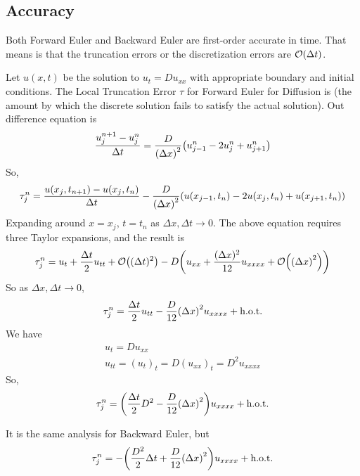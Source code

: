 \documentclass{article}
\newcommand{\Dx}{\Delta x}
\newcommand{\Dt}{\Delta t}
\newcommand{\hot}{\text{h.o.t.}}
\begin{document}
        \subsection{Accuracy}

            Both Forward Euler and Backward Euler are first-order accurate in time.  That means is that the truncation errors or the discretization errors are $\order{\Dt}$.

            Let $u(x,t)$ be the solution to $u_t = Du_{xx}$ with appropriate boundary and initial conditions.  The Local Truncation Error $\tau$ for Forward Euler for Diffusion is (the amount by which the discrete solution fails to satisfy the actual solution).  Out difference equation is
            \begin{align}
                \frac{u_j^{n+1} - u_j^n}{\Dt} = \frac{D}{\qty(\Dx)^2}\qty(u_{j-1}^n - 2u_j^n + u_{j+1}^n)
            \end{align}
            So,
            \begin{align}
                \tau_j^n = \frac{u(x_j,t_{n+1}) - u(x_j,t_n)}{\Dt} - \frac{D}{\qty(\Dx)^2}\qty(u(x_{j-1},t_n) - 2u(x_j,t_n) + u(x_{j+1},t_n))
            \end{align}
            Expanding around $x = x_j$, $t = t_n$ as $\Dx,\Dt \rightarrow 0$.  The above equation requires three Taylor expansions, and the result is
            \begin{align}
                \tau_j^n = u_t + \frac{\Dt}{2}u_{tt} + \order{(\Dt)^2} - D\qty(u_{xx} + \frac{(\Dx)^2}{12}u_{xxxx} + \order{\qty(\Dx)^2})
            \end{align}
            So as $\Dx,\Dt \rightarrow 0$,
            \begin{align}
                \tau_j^n = \frac{\Dt}{2}u_{tt} - \frac{D}{12}\qty(\Dx)^2u_{xxxx} + \hot
            \end{align}
            We have
            \begin{align}
                u_t = Du_{xx} \\
                u_{tt} = (u_t)_t = D(u_{xx})_t = D^2u_{xxxx}
            \end{align}
            So,
            \begin{align}
                \tau_j^n = \qty(\frac{\Dt}{2}D^2 - \frac{D}{12}\qty(\Dx)^2)u_{xxxx} + \hot
            \end{align}

            It is the same analysis for Backward Euler, but
            \begin{align}
                \tau_j^n = -\qty(\frac{D^2}{2}\Dt + \frac{D}{12}\qty(\Dx)^2)u_{xxxx} + \hot
            \end{align}
\end{document}
